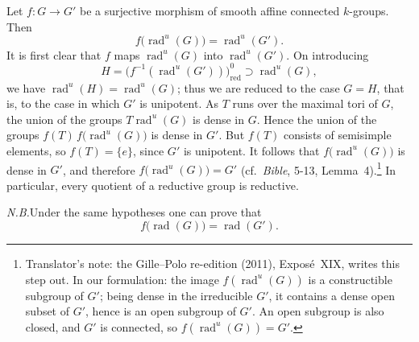Let \(f:G\longrightarrow G'\) be a surjective morphism of smooth affine
connected \(k\)-groups.  Then
\[
  f\bigl(\operatorname{rad}^{u}(G)\bigr)
  =
  \operatorname{rad}^{u}(G').
\]
It is first clear that \(f\) maps \(\operatorname{rad}^{u}(G)\) into
\(\operatorname{rad}^{u}(G')\).  On introducing
\[
  H=
  \bigl(f^{-1}(\operatorname{rad}^{u}(G'))\bigr)_{\mathrm{red}}^{0}
  \supset\operatorname{rad}^{u}(G),
\]
we have \(\operatorname{rad}^{u}(H)=\operatorname{rad}^{u}(G)\); thus we are
reduced to the case \(G=H\), that is, to the case in which \(G'\) is
unipotent.  As \(T\) runs over the maximal tori of \(G\), the union of the
groups \(T\operatorname{rad}^{u}(G)\) is dense in \(G\).  Hence the union of
the groups \(f(T)\,f\bigl(\operatorname{rad}^{u}(G)\bigr)\) is dense in
\(G'\).  But \(f(T)\) consists of semisimple elements, so \(f(T)=\{e\}\),
since \(G'\) is unipotent.  It follows that
\(f\bigl(\operatorname{rad}^{u}(G)\bigr)\) is dense in \(G'\), and therefore
\(f\bigl(\operatorname{rad}^{u}(G)\bigr)=G'\) (cf.\ \emph{Bible}, 5-13,
Lemma~4).\footnote{Translator's note: the Gille--Polo re-edition (2011), Exposé~XIX, writes this step
out. In our formulation: the image \(f(\operatorname{rad}^{u}(G))\) is a
constructible subgroup of \(G'\); being dense in the irreducible \(G'\), it
contains a dense open subset of \(G'\), hence is an open subgroup of \(G'\).
An open subgroup is also closed, and \(G'\) is connected, so
\(f(\operatorname{rad}^{u}(G))=G'\).}  In particular, every quotient of a reductive group is reductive.

\noindent\textit{N.B.}\quad Under the same hypotheses one can prove that
\[
  f\bigl(\operatorname{rad}(G)\bigr)=\operatorname{rad}(G').
\]
